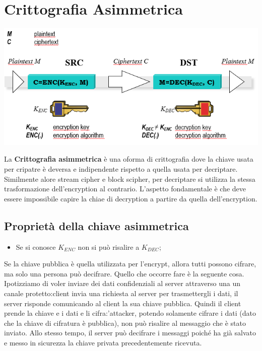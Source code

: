 \documentclass{book}
\theoremstyle{remark}
\begin{document}
\section{Crittografia Asimmetrica}
\begin{center}
	\includegraphics[scale=1]{2021-12-02-16-26-53.png}
\end{center}
La \textbf{Crittografia asimmetrica} è una oforma di crittografia dove la chiave usata per cripatre è deversa e indipendente rispetto a quella usata per decriptare\@.
Similmente alore stream cipher e block scipher, per decriptare si utilizza la stessa trasformazione dell'encryption al contrario\@.\newline
L'aspetto fondamentale è che deve essere impossibile capire la chiae di decryption a partire da quella dell'encryption\@.
\subsection{Proprietà della chiave asimmetrica}
\begin{itemize}
	\item Se si conosce \(K_{ENC}\) non si può risalire a \(K_{DEC}\);\@
\end{itemize}
Se la chiave pubblica è quella utilizzata per l'encrypt, allora tutti possono cifrare, ma solo una persona può decifrare\@.\newline
Quello che occorre fare è la seguente cosa\@. Ipotizziamo di voler inviare dei dati confidenziali al server attraverso una un canale protetto:\@il client invia una richiesta al server per trasmettergli i dati, il server risponde comunicando al client la sua
chiave pubblica\@. Quindi il client prende la chiave e i dati e li cifra:\@l'attacker, potendo solamente cifrare i dati (dato che la chiave di cifratura è pubblica), non può risalire al messaggio che è stato inviato\@.
Allo stesso tempo, il server può decifrare i messaggi poiché ha già salvato e messo in sicurezza la chiave privata precedentemente ricevuta\@.
\end{document}
